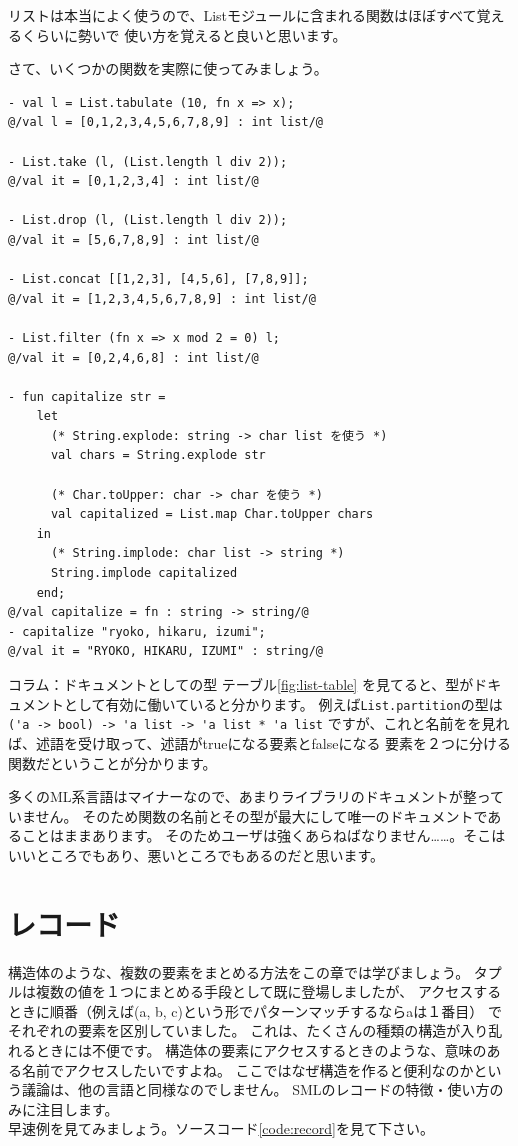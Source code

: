 \documentclass[11pt,a4paper]{article}
\begin{document}
リストは本当によく使うので、Listモジュールに含まれる関数はほぼすべて覚えるくらいに勢いで
使い方を覚えると良いと思います。

さて、いくつかの関数を実際に使ってみましょう。

\begin{lstlisting}[caption=Listモジュール,label=code:list-mod]
- val l = List.tabulate (10, fn x => x);
@/val l = [0,1,2,3,4,5,6,7,8,9] : int list/@

- List.take (l, (List.length l div 2));
@/val it = [0,1,2,3,4] : int list/@

- List.drop (l, (List.length l div 2));
@/val it = [5,6,7,8,9] : int list/@

- List.concat [[1,2,3], [4,5,6], [7,8,9]];
@/val it = [1,2,3,4,5,6,7,8,9] : int list/@

- List.filter (fn x => x mod 2 = 0) l;
@/val it = [0,2,4,6,8] : int list/@

- fun capitalize str =
    let
      (* String.explode: string -> char list を使う *)
      val chars = String.explode str

      (* Char.toUpper: char -> char を使う *)
      val capitalized = List.map Char.toUpper chars
    in
      (* String.implode: char list -> string *)
      String.implode capitalized
    end;
@/val capitalize = fn : string -> string/@
- capitalize "ryoko, hikaru, izumi";
@/val it = "RYOKO, HIKARU, IZUMI" : string/@
\end{lstlisting}

\begin{itembox}[l]{コラム：ドキュメントとしての型}
テーブル\ref{fig:list-table} を見てると、型がドキュメントとして有効に働いていると分かります。
例えば\lstinline{List.partition}の型は\lstinline{('a -> bool) -> 'a list -> 'a list * 'a list}
ですが、これと名前をを見れば、述語を受け取って、述語がtrueになる要素とfalseになる
要素を２つに分ける関数だということが分かります。

多くのML系言語はマイナーなので、あまりライブラリのドキュメントが整っていません。
そのため関数の名前とその型が最大にして唯一のドキュメントであることはままあります。
そのためユーザは強くあらねばなりません……。そこはいいところでもあり、悪いところでもあるのだと思います。
\end{itembox}

\section{レコード}
\label{sec:record}
構造体のような、複数の要素をまとめる方法をこの章では学びましょう。
タプルは複数の値を１つにまとめる手段として既に登場しましたが、
アクセスするときに順番（例えば(a, b, c)という形でパターンマッチするならaは１番目）
でそれぞれの要素を区別していました。
これは、たくさんの種類の構造が入り乱れるときには不便です。
構造体の要素にアクセスするときのような、意味のある名前でアクセスしたいですよね。
ここではなぜ構造を作ると便利なのかという議論は、他の言語と同様なのでしません。
SMLのレコードの特徴・使い方のみに注目します。\\
早速例を見てみましょう。ソースコード\ref{code:record}を見て下さい。
\end{document}
